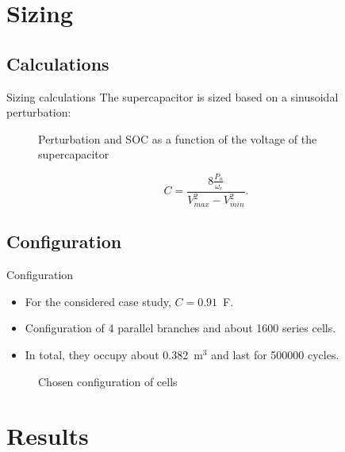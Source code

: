 \section{Sizing}
\subsection{Calculations}
\begin{frame}{Sizing calculations}
  The supercapacitor is sized based on a sinusoidal perturbation:

  \vspace{0.5cm}
\begin{figure}
  \centering
{}
\caption{Perturbation and SOC as a function of the voltage of the supercapacitor}
\label{fig:socc}
\end{figure}
\vspace{-0.2cm}
  \begin{equation}
    C = \frac{8 \frac{P_n}{\omega_c}}{V^2_{max} - V^2_{min}}.
  \end{equation}

\end{frame}

\subsection{Configuration}
\begin{frame}{Configuration}
  \begin{itemize}
    \item For the considered case study, $C=0.91$~F.
    \item Configuration of 4 parallel branches and about 1600 series cells. 
    \item In total, they occupy about 0.382~m$^3$ and last for 500000 cycles.
  \end{itemize}

  \begin{figure}
    \footnotesize
    \caption{Chosen configuration of cells}
    \label{fig:cells}
  \end{figure}

\end{frame}


\section{Results}
